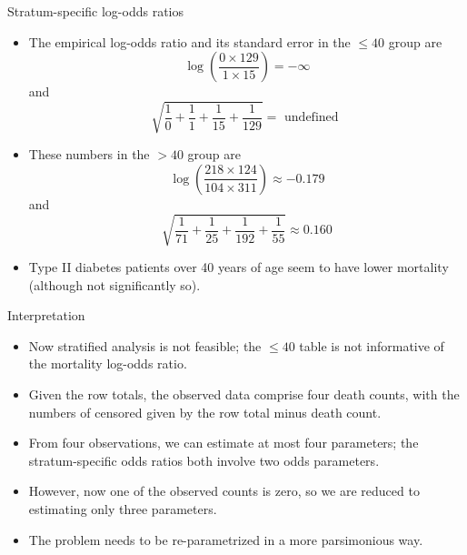 \documentclass[10pt,handout]{beamer}\usepackage[]{graphicx}\usepackage[]{color}
\begin{document}
\begin{frame}{Stratum-specific log-odds ratios}
	\begin{itemize}
		\item The empirical log-odds ratio and its standard error in the $\leq 40$ group are
		$$
		\log \left(\frac{0 \times 129}{1 \times 15}\right)=-\infty
		$$
		and
		$$
		\sqrt{\frac{1}{0}+\frac{1}{1}+\frac{1}{15}+\frac{1}{129}}=\text { undefined }
		$$
		\item  These numbers in the $>40$ group are
		$$
		\log \left(\frac{218 \times 124}{104 \times 311}\right) \approx-0.179
		$$
		and
		$$
		\sqrt{\frac{1}{71}+\frac{1}{25}+\frac{1}{192}+\frac{1}{55}} \approx 0.160
		$$
		\item Type II diabetes patients over 40 years of age seem to have lower mortality (although not significantly so).
	\end{itemize}
\end{frame}



\begin{frame}{Interpretation}
	\begin{itemize}
		\item Now stratified analysis is not feasible; the $\leq 40$ table is not informative of the mortality log-odds ratio.
		\item Given the row totals, the observed data comprise four death counts, with the numbers of censored given by the row total minus death count.
		\item From four observations, we can estimate at most four
		parameters; the stratum-specific odds ratios both involve two odds parameters.
		\item However, now one of the observed counts is zero, so we are reduced to estimating only three parameters.
		\item The problem needs to be re-parametrized in a more parsimonious way.
	\end{itemize}
\end{frame}
\end{document}

